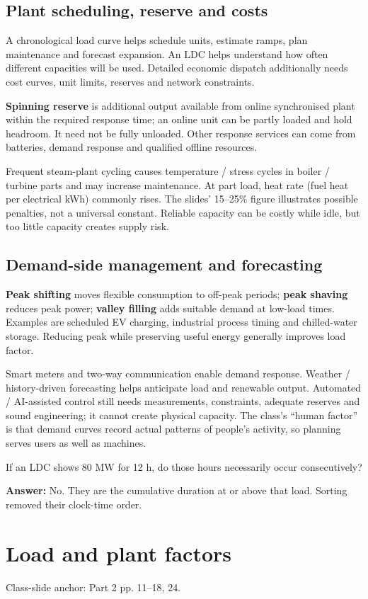 \documentclass[11pt,a4paper]{article}
\newcommand{\slides}[1]{{\small\color{muted}\textsf{Class-slide anchor: #1.}}\par}
\newcommand{\chapterstart}[2]{\clearpage\section{#1}\label{#2}}
\newcommand{\checkq}[2]{\begin{tcolorbox}[breakable=false,colback=pale,colframe=teal,coltitle=white,title={Check your understanding}]#1\par\textbf{Answer:} #2\end{tcolorbox}}
\begin{document}
\subsection{Plant scheduling, reserve and costs}
A chronological load curve helps schedule units, estimate ramps, plan maintenance and forecast expansion. An LDC helps understand how often different capacities will be used. Detailed economic dispatch additionally needs cost curves, unit limits, reserves and network constraints.

\textbf{Spinning reserve} is additional output available from online synchronised plant within the required response time; an online unit can be partly loaded and hold headroom. It need not be fully unloaded. Other response services can come from batteries, demand response and qualified offline resources.

Frequent steam-plant cycling causes temperature / stress cycles in boiler / turbine parts and may increase maintenance. At part load, heat rate (fuel heat per electrical kWh) commonly rises. The slides' 15--25\% figure illustrates possible penalties, not a universal constant. Reliable capacity can be costly while idle, but too little capacity creates supply risk.

\subsection{Demand-side management and forecasting}
\textbf{Peak shifting} moves flexible consumption to off-peak periods; \textbf{peak shaving} reduces peak power; \textbf{valley filling} adds suitable demand at low-load times. Examples are scheduled EV charging, industrial process timing and chilled-water storage. Reducing peak while preserving useful energy generally improves load factor.

Smart meters and two-way communication enable demand response. Weather / history-driven forecasting helps anticipate load and renewable output. Automated / AI-assisted control still needs measurements, constraints, adequate reserves and sound engineering; it cannot create physical capacity. The class's ``human factor'' is that demand curves record actual patterns of people's activity, so planning serves users as well as machines.
\checkq{If an LDC shows 80 MW for 12 h, do those hours necessarily occur consecutively?}{No. They are the cumulative duration at or above that load. Sorting removed their clock-time order.}

\chapterstart{Load and plant factors}{factors}
\slides{Part 2 pp. 11--18, 24}
\end{document}
